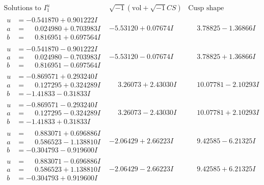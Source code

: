\documentclass[1p]{elsarticle_modified}
\theoremstyle{definition}
\newcommand{\I}{\sqrt{-1}}
\begin{document}
$$\begin{array}{c|c|c}  
\text{Solutions to }I^u_{1}& \I (\text{vol} + \sqrt{-1}CS) & \text{Cusp shape}\\
 \hline 
\begin{aligned}
u &= -0.541870 + 0.901222 I \\
a &= \phantom{-}0.024980 + 0.703983 I \\
b &= \phantom{-}0.816951 + 0.697564 I\end{aligned}
 & -5.53120 + 0.07674 I & \phantom{-}3.78825 - 1.36866 I \\ \hline\begin{aligned}
u &= -0.541870 - 0.901222 I \\
a &= \phantom{-}0.024980 - 0.703983 I \\
b &= \phantom{-}0.816951 - 0.697564 I\end{aligned}
 & -5.53120 - 0.07674 I & \phantom{-}3.78825 + 1.36866 I \\ \hline\begin{aligned}
u &= -0.869571 + 0.293240 I \\
a &= \phantom{-}0.127295 + 0.324289 I \\
b &= -1.41833 - 0.31833 I\end{aligned}
 & \phantom{-}3.26073 + 2.43030 I & \phantom{-}10.07781 - 2.10293 I \\ \hline\begin{aligned}
u &= -0.869571 - 0.293240 I \\
a &= \phantom{-}0.127295 - 0.324289 I \\
b &= -1.41833 + 0.31833 I\end{aligned}
 & \phantom{-}3.26073 - 2.43030 I & \phantom{-}10.07781 + 2.10293 I \\ \hline\begin{aligned}
u &= \phantom{-}0.883071 + 0.696886 I \\
a &= \phantom{-}0.586523 - 1.138810 I \\
b &= -0.304793 - 0.919600 I\end{aligned}
 & -2.06429 + 2.66223 I & \phantom{-}9.42585 - 6.21325 I \\ \hline\begin{aligned}
u &= \phantom{-}0.883071 - 0.696886 I \\
a &= \phantom{-}0.586523 + 1.138810 I \\
b &= -0.304793 + 0.919600 I\end{aligned}
 & -2.06429 - 2.66223 I & \phantom{-}9.42585 + 6.21325 I \\ \hline\begin{aligned}

\end{aligned}
\end{array}$$
\end{document}
